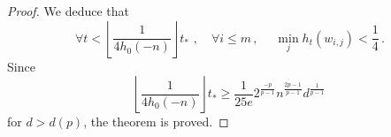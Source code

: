 \documentclass[10pt,a4paper]{amsart}
\begin{document}
\begin{proof}
We deduce that 
$$  \forall t<\left\lfloor\frac{1}{4h_0(-n)} \right\rfloor t_* \, \,,\quad  \forall i\le m \,,\quad \; \min_j h_t(w_{i,j})<\frac{1}{4} \, .$$ Since $$\left\lfloor\frac{1}{4h_0(-n)} \right\rfloor t_* \geq \frac{1}{25e} 2^\frac{-p}{p-1}n^\frac{2p-1}{p-1}d^\frac{1}{p-1} \, $$ for $d>d(p)$, the theorem is proved.


    
\end{proof}
\end{document}
